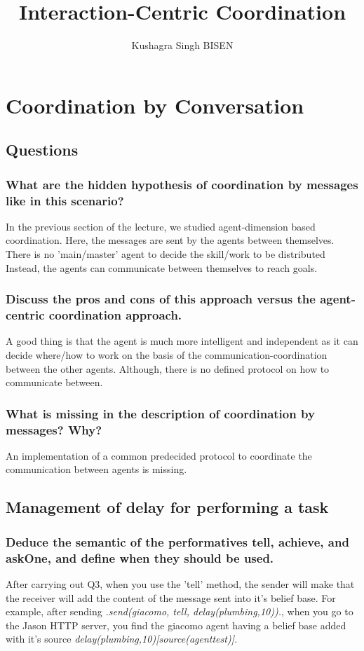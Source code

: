 \documentclass[]{article}
\title{Interaction-Centric Coordination}
\author{Kushagra Singh BISEN}
\begin{document}
\maketitle

\section{Coordination by Conversation}

\subsection{Questions}

\subsubsection{What are the hidden hypothesis of coordination by messages like in this scenario?}
In the previous section of the lecture, we studied agent-dimension based coordination. Here, the messages are 
sent by the agents between themselves. There is no 'main/master' agent to decide the skill/work to be distributed
Instead, the agents can communicate between themselves to reach goals. 
\subsubsection{Discuss the pros and cons of this approach versus the agent-centric coordination approach.}
A good thing is that the agent is much more intelligent and independent as it can decide where/how to work
on the basis of the communication-coordination between the other agents. Although, there is no defined protocol on how
to communicate between.
\subsubsection{What is missing in the description of coordination by messages? Why?}
An implementation of a common predecided protocol to coordinate the communication between agents is missing. 
\subsection{Management of delay for performing a task}

\subsubsection{Deduce the semantic of the performatives tell, achieve, and askOne, and define when they should be used.}
After carrying out Q3, when you use the 'tell' method, the sender will make that the receiver will add the content 
of the message sent into it's belief base. For example, after sending \emph{.send(giacomo, tell, delay(plumbing,10)).}, when
you go to the Jason HTTP server, you find the giacomo agent having a belief base added with it's source \emph{delay(plumbing,10)[source(agenttest)].}
\end{document}
